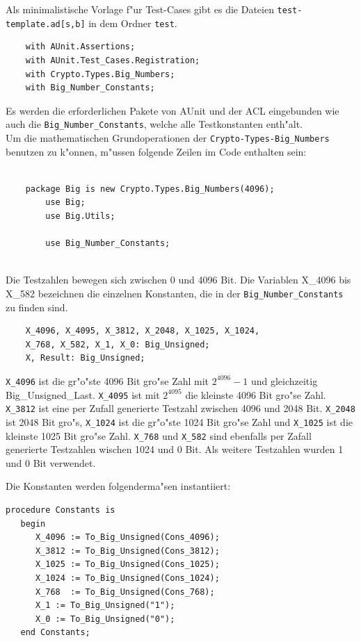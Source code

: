Als minimalistische Vorlage f"ur Test-Cases gibt es die Dateien {\tt test-template.ad[s,b]} in dem Ordner {\tt test}.

\begin{lstlisting}
	with AUnit.Assertions; 
	with AUnit.Test_Cases.Registration;
	with Crypto.Types.Big_Numbers;
	with Big_Number_Constants;

\end{lstlisting}


Es werden die erforderlichen Pakete von AUnit und der ACL eingebunden wie auch die {\tt Big\_Number\_Constants}, welche alle Testkonstanten enth"alt.\\
Um die mathematischen Grundoperationen der {\tt Crypto-Types-Big\_Numbers} benutzen zu k"onnen, m"ussen folgende Zeilen im Code enthalten sein:

\begin{lstlisting}
	
    package Big is new Crypto.Types.Big_Numbers(4096);
    	use Big;
    	use Big.Utils;

    	use Big_Number_Constants;
    	
\end{lstlisting}

Die Testzahlen bewegen sich zwischen 0 und 4096 Bit.
Die Variablen X\_4096 bis X\_582 bezeichnen die einzelnen Konstanten, die in der {\tt Big\_Number\_Constants} zu finden sind.\\

\begin{lstlisting}
    X_4096, X_4095, X_3812, X_2048, X_1025, X_1024,
    X_768, X_582, X_1, X_0: Big_Unsigned;
    X, Result: Big_Unsigned;
\end{lstlisting}

{\tt X\_4096} ist die gr"o"ste 4096 Bit gro"se Zahl mit $2^{4096} - 1$ und gleichzeitig Big\_Unsigned\_Last. {\tt X\_4095} ist mit $2^{4095}$ die kleinste 4096 Bit gro"se Zahl.
{\tt X\_3812} ist eine per Zufall generierte Testzahl zwischen 4096 und 2048 Bit.
{\tt X\_2048} ist 2048 Bit gro"s, {\tt X\_1024} ist die gr"o"ste 1024 Bit gro"se Zahl und {\tt X\_1025} ist die kleinste 1025 Bit gro"se Zahl.
{\tt X\_768} und {\tt X\_582} sind ebenfalls per Zafall generierte Testzahlen wischen 1024 und 0 Bit.
Als weitere Testzahlen wurden 1 und 0 Bit verwendet.

Die Konstanten werden folgenderma"sen instantiiert:

\begin{lstlisting}
procedure Constants is
   begin
      X_4096 := To_Big_Unsigned(Cons_4096);
      X_3812 := To_Big_Unsigned(Cons_3812);
      X_1025 := To_Big_Unsigned(Cons_1025);
      X_1024 := To_Big_Unsigned(Cons_1024);
      X_768  := To_Big_Unsigned(Cons_768);
      X_1 := To_Big_Unsigned("1");
      X_0 := To_Big_Unsigned("0");
   end Constants;
\end{lstlisting}

